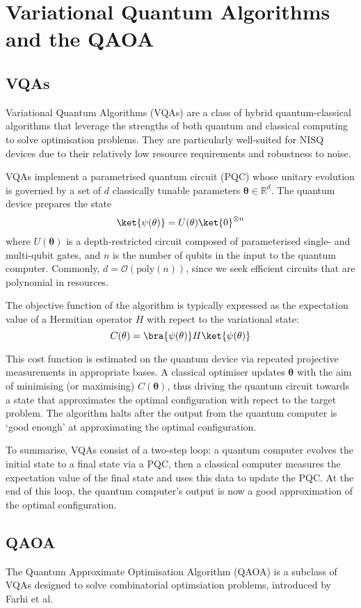 \section{Variational Quantum Algorithms and the QAOA}
\subsection{VQAs}
Variational Quantum Algorithms (VQAs) are a class of hybrid quantum-classical algorithms that leverage the strengths of both quantum and classical computing to solve optimisation problems. They are particularly well-suited for NISQ devices due to their relatively low resource requirements and robustness to noise.

VQAs implement a parametrised quantum circuit (PQC) whose unitary evolution is governed by a set of $d$ classically tunable parameters $\mathbf{\theta}\in\mathbb{R}^d$. The quantum device prepares the state
$$\ket{\psi(\mathbf{\theta})}=U(\mathbf{\theta})\ket{0}^{\otimes n}$$
where $U(\mathbf{\theta})$ is a depth-restricted circuit composed of parameterised single- and multi-qubit gates, and $n$ is the number of qubits in the input to the quantum computer. Commonly, $d=\mathcal{O}(\text{poly}(n))$, since we seek efficient circuits that are polynomial in resources. 

The objective function of the algorithm is typically expressed as the expectation value of a Hermitian operator $H$ with repect to the variational state:
$$C(\mathbf{\theta})= \bra{\psi(\mathbf{\theta})}H\ket{\psi(\mathbf{\theta})} $$

This cost function is estimated on the quantum device via repeated projective measurements in appropriate bases. A classical optimiser updates $\mathbf{\theta}$ with the aim of minimising (or maximising) $C(\mathbf{\theta})$, thus driving the quantum circuit towards a state that approximates the optimal configuration with repect to the target problem. The algorithm halts after the output from the quantum computer is `good enough' at approximating the optimal configuration.

To summarise, VQAs consist of a two-step loop: a quantum computer evolves the initial state to a final state via a PQC, then a classical computer measures the expectation value of the final state and uses this data to update the PQC. At the end of this loop, the quantum computer's output is now a good approximation of the optimal configuration.

\subsection{QAOA}
The Quantum Approximate Optimisation Algorithm (QAOA) is a subclass of VQAs designed to solve combinatorial optimsiation problems, introduced by Farhi et al.

